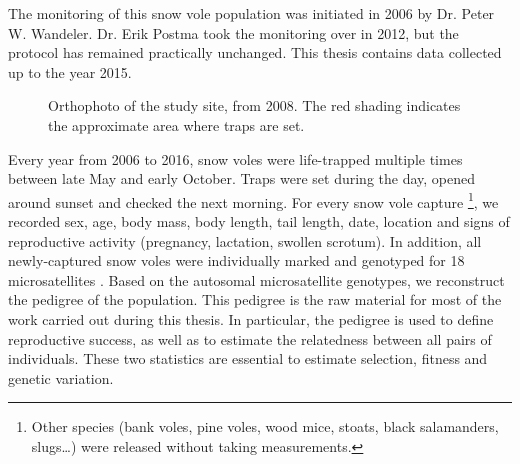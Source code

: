 The monitoring of this snow vole population was initiated in 2006 by Dr. Peter W. Wandeler. Dr. Erik Postma took the monitoring over in 2012, but the protocol has remained practically unchanged. This thesis contains data collected up to the year 2015.
\begin{figure}[ht]
	\caption{Orthophoto of the study site, from 2008. The red shading indicates the approximate area where traps are set.}
	\label{fig:fieldarea}
\end{figure}
Every year from 2006 to 2016, snow voles were life-trapped multiple times between late May and early October. Traps were set during the day, opened around sunset and checked the next morning. 
For every snow vole capture \footnote{Other species (bank voles, pine voles, wood mice, stoats, black salamanders, slugs\dots) were released without taking measurements.}, we recorded sex, age, body mass, body length, tail length, date, location and signs of reproductive activity (pregnancy, lactation, swollen scrotum). 
In addition, all newly-captured snow voles were individually marked and genotyped for 18 microsatellites \parencite{Wandeler2008}. Based on the autosomal microsatellite genotypes, we reconstruct the pedigree of the population. This pedigree is the raw material for most of the work carried out during this thesis. In particular, the pedigree is used to define reproductive success, as well as to estimate the relatedness between all pairs of individuals. These two statistics are essential to estimate selection, fitness and genetic variation. 


